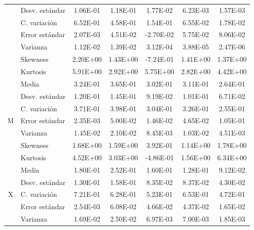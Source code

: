 \documentclass[conference]{IEEEtran}
\begin{document}
\begin{table}[H]
\begin{tabular}{|c|l|c|c|c|c|c|}
                     & Desv. estándar & 1.06E-01  & 1.18E-01  & 1.77E-02  & 6.23E-03 & 1.57E-03  \\ \cline{2-7} 
                     & C. variación   & 6.52E-01  & 4.58E-01  & 1.54E-01  & 6.55E-02 & 1.78E-02  \\ \cline{2-7} 
                     & Error estándar & 2.07E-03  & 4.51E-02  & -2.70E-02 & 5.75E-02 & 8.06E-02  \\ \cline{2-7} 
                     & Varianza       & 1.12E-02  & 1.39E-02  & 3.12E-04  & 3.88E-05 & 2.47E-06  \\ \cline{2-7} 
                     & Skewness       & 2.20E+00  & 1.43E+00  & -7.24E-01 & 1.41E+00 & 1.37E+00  \\ \cline{2-7} 
                     & Kurtosis       & 5.91E+00  & 2.92E+00  & 5.75E+00  & 2.82E+00 & 4.42E+00  \\ \hline
\multirow{7}{*}{M}   & Media          & 3.24E-01  & 3.65E-01  & 3.02E-01  & 3.11E-01 & 2.64E-01  \\ \cline{2-7} 
                     & Desv. estándar & 1.20E-01  & 1.45E-01  & 9.19E-02  & 1.01E-01 & 6.71E-02  \\ \cline{2-7} 
                     & C. variación   & 3.71E-01  & 3.98E-01  & 3.04E-01  & 3.26E-01 & 2.55E-01  \\ \cline{2-7} 
                     & Error estándar & 2.35E-03  & 5.00E-02  & 1.46E-02  & 4.65E-02 & 1.05E-01  \\ \cline{2-7} 
                     & Varianza       & 1.45E-02  & 2.10E-02  & 8.45E-03  & 1.03E-02 & 4.51E-03  \\ \cline{2-7} 
                     & Skewness       & 1.68E+00  & 1.59E+00  & 3.92E-01  & 1.14E+00 & 1.78E+00  \\ \cline{2-7} 
                     & Kurtosis       & 4.52E+00  & 3.03E+00  & -4.86E-01 & 1.56E+00 & 6.34E+00  \\ \hline
\multirow{7}{*}{X}   & Media          & 1.80E-01  & 2.52E-01  & 1.60E-01  & 1.28E-01 & 9.12E-02  \\ \cline{2-7} 
                     & Desv. estándar & 1.30E-01  & 1.58E-01  & 8.35E-02  & 8.37E-02 & 4.30E-02  \\ \cline{2-7} 
                     & C. variación   & 7.21E-01  & 6.28E-01  & 5.23E-01  & 6.53E-01 & 4.72E-01  \\ \cline{2-7} 
                     & Error estándar & 2.54E-03  & 6.08E-02  & 4.66E-02  & 4.37E-02 & 1.65E-02  \\ \cline{2-7} 
                     & Varianza       & 1.69E-02  & 2.50E-02  & 6.97E-03  & 7.00E-03 & 1.85E-03  \\ \cline{2-7} 

\end{tabular}
\end{table}
\end{document}
